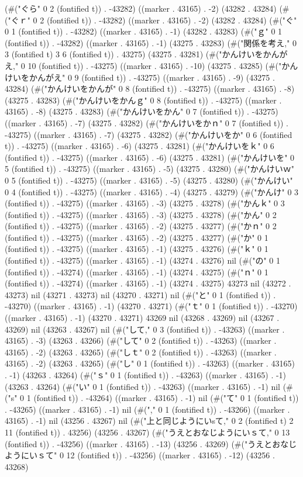 (#("ぐら" 0 2 (fontified t)) . -43282) ((marker . 43165) . -2) (43282 . 43284) (#("ぐｒ" 0 2 (fontified t)) . -43282) ((marker . 43165) . -2) (43282 . 43284) (#("ぐ" 0 1 (fontified t)) . -43282) ((marker . 43165) . -1) (43282 . 43283) (#("ｇ" 0 1 (fontified t)) . -43282) ((marker . 43165) . -1) (43275 . 43283) (#("関係を考え," 0 3 (fontified t) 3 6 (fontified t)) . 43275) (43275 . 43281) (#("かんけいをかんがえ," 0 10 (fontified t)) . -43275) ((marker . 43165) . -10) (43275 . 43285) (#("かんけいをかんがえ" 0 9 (fontified t)) . -43275) ((marker . 43165) . -9) (43275 . 43284) (#("かんけいをかんが" 0 8 (fontified t)) . -43275) ((marker . 43165) . -8) (43275 . 43283) (#("かんけいをかんｇ" 0 8 (fontified t)) . -43275) ((marker . 43165) . -8) (43275 . 43283) (#("かんけいをかん" 0 7 (fontified t)) . -43275) ((marker . 43165) . -7) (43275 . 43282) (#("かんけいをかｎ" 0 7 (fontified t)) . -43275) ((marker . 43165) . -7) (43275 . 43282) (#("かんけいをか" 0 6 (fontified t)) . -43275) ((marker . 43165) . -6) (43275 . 43281) (#("かんけいをｋ" 0 6 (fontified t)) . -43275) ((marker . 43165) . -6) (43275 . 43281) (#("かんけいを" 0 5 (fontified t)) . -43275) ((marker . 43165) . -5) (43275 . 43280) (#("かんけいｗ" 0 5 (fontified t)) . -43275) ((marker . 43165) . -5) (43275 . 43280) (#("かんけい" 0 4 (fontified t)) . -43275) ((marker . 43165) . -4) (43275 . 43279) (#("かんけ" 0 3 (fontified t)) . -43275) ((marker . 43165) . -3) (43275 . 43278) (#("かんｋ" 0 3 (fontified t)) . -43275) ((marker . 43165) . -3) (43275 . 43278) (#("かん" 0 2 (fontified t)) . -43275) ((marker . 43165) . -2) (43275 . 43277) (#("かｎ" 0 2 (fontified t)) . -43275) ((marker . 43165) . -2) (43275 . 43277) (#("か" 0 1 (fontified t)) . -43275) ((marker . 43165) . -1) (43275 . 43276) (#("ｋ" 0 1 (fontified t)) . -43275) ((marker . 43165) . -1) (43274 . 43276) nil (#("の" 0 1 (fontified t)) . -43274) ((marker . 43165) . -1) (43274 . 43275) (#("ｎ" 0 1 (fontified t)) . -43274) ((marker . 43165) . -1) (43274 . 43275) 43273 nil (43272 . 43273) nil (43271 . 43273) nil (43270 . 43271) nil (#("と" 0 1 (fontified t)) . -43270) ((marker . 43165) . -1) (43270 . 43271) (#("ｔ" 0 1 (fontified t)) . -43270) ((marker . 43165) . -1) (43270 . 43271) 43269 nil (43268 . 43269) nil (43267 . 43269) nil (43263 . 43267) nil (#("して," 0 3 (fontified t)) . -43263) ((marker . 43165) . -3) (43263 . 43266) (#("して" 0 2 (fontified t)) . -43263) ((marker . 43165) . -2) (43263 . 43265) (#("しｔ" 0 2 (fontified t)) . -43263) ((marker . 43165) . -2) (43263 . 43265) (#("し" 0 1 (fontified t)) . -43263) ((marker . 43165) . -1) (43263 . 43264) (#("ｓ" 0 1 (fontified t)) . -43263) ((marker . 43165) . -1) (43263 . 43264) (#("い" 0 1 (fontified t)) . -43263) ((marker . 43165) . -1) nil (#("s" 0 1 (fontified t)) . -43264) ((marker . 43165) . -1) nil (#("て" 0 1 (fontified t)) . -43265) ((marker . 43165) . -1) nil (#("," 0 1 (fontified t)) . -43266) ((marker . 43165) . -1) nil (43256 . 43267) nil (#("上と同じようにいsて," 0 2 (fontified t) 2 11 (fontified t)) . 43256) (43256 . 43267) (#("うえとおなじようにいｓて," 0 13 (fontified t)) . -43256) ((marker . 43165) . -13) (43256 . 43269) (#("うえとおなじようにいｓて" 0 12 (fontified t)) . -43256) ((marker . 43165) . -12) (43256 . 43268) 